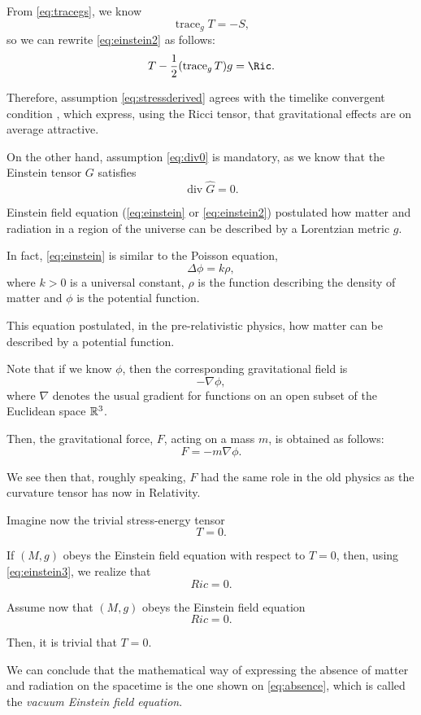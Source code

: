 From \autoref{eq:tracegs}, we know
\[
	\operatorname{trace}_g T = -S,
\]
so we can rewrite \autoref{eq:einstein2} as follows:
\begin{equation}
	\label{eq:einstein3}
	T - \frac{1}{2}(\operatorname{trace}_g T)g = \Ric.
\end{equation}

Therefore, assumption \ref{eq:stressderived} agrees with the timelike convergent condition \cite[p. 123]{sachs77}, which express, using the Ricci tensor, that gravitational effects are on average attractive.

On the other hand, assumption \ref{eq:div0} is mandatory, as we know that the Einstein tensor $G$ satisfies
\[
	\operatorname{div} \hat{G} = 0.
\]

Einstein field equation (\autoref{eq:einstein} or \autoref{eq:einstein2}) postulated how matter and radiation in a region of the universe can be described by a Lorentzian metric $g$.

In fact, \autoref{eq:einstein} is similar to the Poisson equation,
\[
	\Delta\phi = k\rho,
\]
where $k>0$ is a universal constant, $\rho$ is the function describing the density of matter and $\phi$ is the potential function.

This equation postulated, in the pre-relativistic physics, how matter can be described by a potential function.

Note that if we know $\phi$, then the corresponding gravitational field is 
\[
	-\nabla \phi,
\]
where $\nabla$ denotes the usual gradient for functions on an open subset of the Euclidean space $\mathbb{R}^3$.

Then, the gravitational force, $F$, acting on a mass $m$, is obtained as follows:
\[
	F = -m\nabla\phi.
\]

We see then that, roughly speaking, $F$ had the same role in the old physics as the curvature tensor has now in Relativity.

Imagine now the trivial stress-energy tensor
\[
	T = 0.
\]

If $(M,g)$ obeys the Einstein field equation with respect to $T = 0$, then, using \autoref{eq:einstein3}, we realize that
\[
	Ric = 0.
\]

Assume now that $(M,g)$ obeys the Einstein field equation
\begin{equation}
	\label{eq:absence}
	Ric = 0.
\end{equation}

Then, it is trivial that $T=0$.

We can conclude that the mathematical way of expressing the absence of matter and radiation on the spacetime is the one shown on \autoref{eq:absence}, which is called the \emph{vacuum Einstein field equation}.